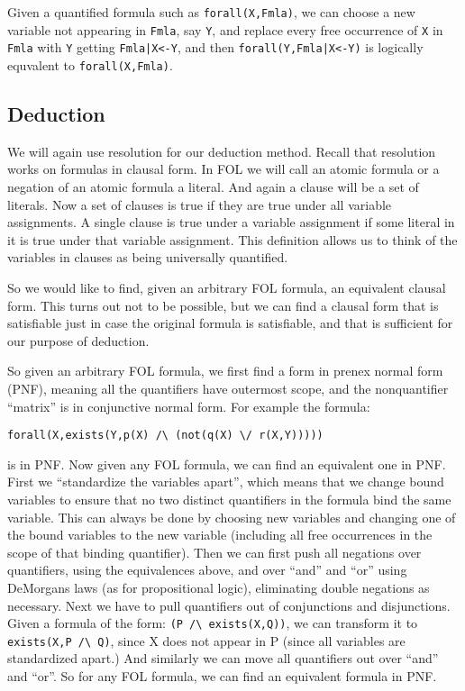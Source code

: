 Given a quantified formula such as \verb|forall(X,Fmla)|, we can choose a new
variable not appearing in \verb|Fmla|, say \verb|Y|, and replace every free
occurrence of \verb|X| in \verb|Fmla| with \verb|Y| getting \verb/Fmla|X<-Y/, and then
\verb/forall(Y,Fmla|X<-Y)/ is logically equvalent to \verb|forall(X,Fmla)|.

\subsection{Deduction}

We will again use resolution for our deduction method.  Recall that
resolution works on formulas in clausal form.  In FOL we will call an
atomic formula or a negation of an atomic formula a literal.  And
again a clause will be a set of literals.  Now a set of clauses is
true if they are true under all variable assignments.  A single clause is
true under a variable assignment if some literal in it is true under
that variable assignment.  This definition allows us to think of
the variables in clauses as being universally quantified.

So we would like to find, given an arbitrary FOL formula, an
equivalent clausal form.  This turns out not to be possible, but we
can find a clausal form that is satisfiable just in case the original
formula is satisfiable, and that is sufficient for our purpose of
deduction.

So given an arbitrary FOL formula, we first find a form in prenex
normal form (PNF), meaning all the quantifiers have outermost scope, and
the nonquantifier ``matrix'' is in conjunctive normal form.  For
example the formula:
\begin{verbatim}
forall(X,exists(Y,p(X) /\ (not(q(X) \/ r(X,Y)))))
\end{verbatim}
is in PNF.  Now given any FOL formula, we can find an equivalent one
in PNF.  First we ``standardize the variables apart'', which means
that we change bound variables to ensure that no two distinct
quantifiers in the formula bind the same variable.  This can always be
done by choosing new variables and changing one of the bound variables
to the new variable (including all free occurrences in the scope of
that binding quantifier).  Then we can first push all negations over quantifiers,
using the equivalences above, and over ``and'' and ``or'' using
DeMorgans laws (as for propositional logic), eliminating double
negations as necessary.  Next we have to pull quantifiers out of
conjunctions and disjunctions.  Given a formula of the form: 
\verb|(P /\ exists(X,Q))|, we can transform it to 
\verb|exists(X,P /\ Q)|, since X does
not appear in P (since all variables are standardized apart.)  And
similarly we can move all quantifiers out over ``and'' and ``or''.  So
for any FOL formula, we can find an equivalent formula in PNF.

